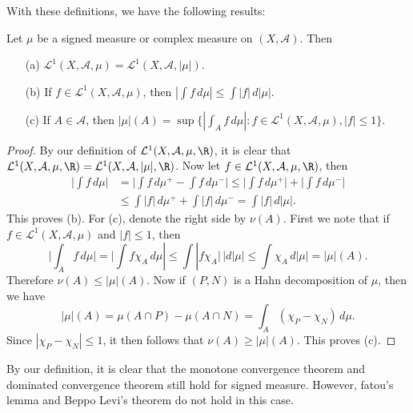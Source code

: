With these definitions, we have the following results:
\begin{proposition}\label{int signed measure prop}
Let $\mu$ be a signed measure or complex measure on $(X,\mathcal{A})$. Then
\begin{itemize}
\item[(a)] $\mathcal{L}^1(X,\mathcal{A},\mu)=\mathcal{L}^1(X,\mathcal{A},|\mu|)$.
\item[(b)] If $f\in\mathcal{L}^1(X,\mathcal{A},\mu)$, then $|\int f\,d\mu|\leq\int|f|\,d|\mu|$.
\item[(c)] If $A\in\mathcal{A}$, then $|\mu|(A)=\sup\{|\int_Af\,d\mu|:f\in\mathcal{L}^1(X,\mathcal{A},\mu),|f|\leq 1\}$. 
\end{itemize}
\end{proposition}
\begin{proof}
By our definition of $\mathcal{L}^1(X,\mathcal{A},\mu,\R)$, it is clear that $\mathcal{L}^1(X,\mathcal{A},\mu,\R)=\mathcal{L}^1(X,\mathcal{A},|\mu|,\R)$. Now let $f\in\mathcal{L}^1(X,\mathcal{A},\mu,\R)$, then
\begin{align*}
\Big|\int f\,d\mu\Big|&=\Big|\int f\,d\mu^+-\int f\,d\mu^-\Big|\leq\Big|\int f\,d\mu^+\Big|+\Big|\int f\,d\mu^-\Big|\\
&\leq\int|f|\,d\mu^++\int|f|\,d\mu^-=\int|f|\,d|\mu|.
\end{align*}
This proves (b). For (c), denote the right side by $\nu(A)$. First we note that if $f\in\mathcal{L}^1(X,\mathcal{A},\mu)$ and $|f|\leq 1$, then
\[\Big|\int_Af\,d\mu\Big|=\Big|\int f\chi_A\,d\mu|\leq\int|f\chi_A|\,|d|\mu|\leq\int\chi_A\,d|\mu|=|\mu|(A).\]
Therefore $\nu(A)\leq|\mu|(A)$. Now if $(P,N)$ is a Hahn decomposition of $\mu$, then we have
\[|\mu|(A)=\mu(A\cap P)-\mu(A\cap N)=\int_A(\chi_P-\chi_N)\,d\mu.\]
Since $|\chi_P-\chi_N|\leq 1$, it then follows that $\nu(A)\geq|\mu|(A)$. This proves (c).
\end{proof}
\begin{remark}
By our definition, it is clear that the monotone convergence theorem and dominated convergence theorem still hold for signed measure. However, fatou's lemma and Beppo Levi's theorem do not hold in this case.
\end{remark}
